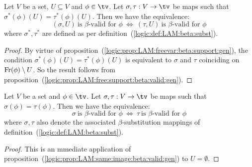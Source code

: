 \begin{prop}\label{logic:prop:LAM:same:image:beta:valid:gen}
    Let $V$ be a set, $U\subseteq V$ and $\phi\in\tv$. Let $\sigma,\tau:V\to\tv$ 
    be maps such that $\sigma^{*}(\phi)(U)=\tau^{*}(\phi)(U)$. Then we have the 
    equivalence:
        \[
            (\sigma,U)\ \mbox{is $\beta$-valid for $\phi$}\ 
            \Leftrightarrow\
            (\tau,U)\ \mbox{is $\beta$-valid for $\phi$}
        \]
    where $\sigma^{*}, \tau^{*}$ are defined as per 
    definition~(\ref{logic:def:LAM:beta:subst}).
\end{prop}
\begin{proof}
    By virtue of proposition~(\ref{logic:prop:LAM:freevar:beta:support:gen}),
    the condition $\sigma^{*}(\phi)(U)=\tau^{*}(\phi)(U)$ is equivalent
    to $\sigma$ and $\tau$ coinciding on $\mbox{\rm Fr}(\phi)\setminus U$. So the
    result follows from
    proposition~(\ref{logic:prop:LAM:free:support:beta:valid:gen}).
\end{proof}

\begin{prop}\label{logic:prop:LAM:same:image:beta:valid}
    Let $V$ be a set and $\phi\in\tv$. Let $\sigma,\tau:V\to\tv$ be maps such 
    that $\sigma(\phi)=\tau(\phi)$. Then we have the equivalence:
        \[
            \sigma\ \mbox{is $\beta$-valid for $\phi$}\ 
            \Leftrightarrow\
            \tau\ \mbox{is $\beta$-valid for $\phi$}
        \]
    where $\sigma, \tau$ also denote the associated $\beta$-substitution 
    mappings of definition~(\ref{logic:def:LAM:beta:subst}).
\end{prop}
\begin{proof}
    This is an mmediate application of 
    proposition~(\ref{logic:prop:LAM:same:image:beta:valid:gen})
    to $U=\emptyset$.
\end{proof}

